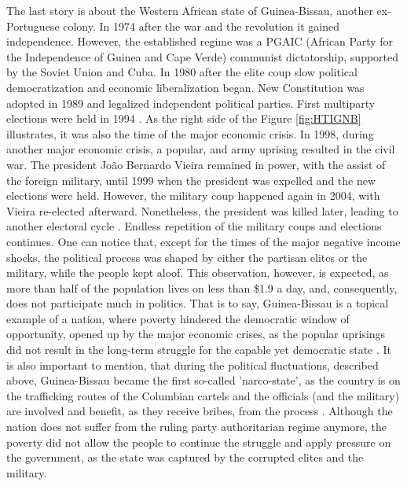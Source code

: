 \documentclass[a4paper, 12pt]{article}
\begin{document}
	\noindent The last story is about the Western African state of Guinea-Bissau, another ex-Portuguese colony. In 1974 after the war and the revolution it gained independence. However, the established regime was a PGAIC (African Party for the Independence of Guinea and Cape Verde) communist dictatorship, supported by the Soviet Union and Cuba. In 1980 after the elite coup slow political democratization and economic liberalization began. New Constitution was adopted in 1989 and legalized independent political parties. First multiparty elections were held in 1994 \parencite{guinea1}. As the right side of the Figure \ref{fig:HTIGNB} illustrates, it was also the time of the major economic crisis. In 1998, during another major economic crisis, a popular, and army uprising resulted in the civil war. The president Jo{ã}o Bernardo Vieira remained in power, with the assist of the foreign military, until 1999 when the president was expelled and the new elections were held. However, the military coup happened again in 2004, with Vieira re-elected afterward. Nonetheless, the president was killed later, leading to another electoral cycle \parencite{guinea2}. Endless repetition of the military coups and elections continues. One can notice that, except for the times of the major negative income shocks, the political process was shaped by either the partisan elites or the military, while the people kept aloof. This observation, however, is expected, as more than half of the population lives on less than \$1.9 a day, and, consequently, does not participate much in politics. That is to say, Guinea-Bissau is a topical example of a nation, where poverty hindered the democratic window of opportunity, opened up by the major economic crises, as the popular uprisings did not result in the long-term struggle for the capable yet democratic state \parencite{guinea4}. It is also important to mention, that during the political fluctuations, described above, Guinea-Bissau became the first so-called 'narco-state', as the country is on the trafficking routes of the Columbian cartels and the officials (and the military) are involved and benefit, as they receive bribes, from the process \parencite{guinea3}. Although the nation does not suffer from the ruling party authoritarian regime anymore, the poverty did not allow the people to continue the struggle and apply pressure on the government, as the state was captured by the corrupted elites and the military.
	\\
	
\end{document}

